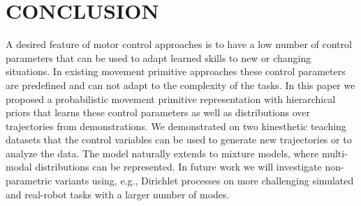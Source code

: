\documentclass[letterpaper, 10 pt, conference]{ieeeconf}  %
\begin{document}
\section{CONCLUSION}
  
A desired feature of motor control approaches is to have a low number of 
control parameters that can be used to adapt learned skills to new or changing situations. 
In existing movement primitive approaches \cite{Paraschos2013,Ijspeert2003,Khansari-Zadeh2011} 
 these control parameters are predefined and can not adapt to the complexity of the tasks. 
In this paper we proposed a probabilistic movement primitive representation with hierarchical priors 
that learns these control parameters as well as distributions over trajectories 
from demonstrations. We demonstrated on two kinesthetic teaching datasets that 
the control variables can be used to generate new trajectories or to analyze the data. 
The model naturally extends to mixture models, where multi-modal distributions can be represented. 
In future work we will investigate non-parametric variants using, e.g., Dirichlet processes 
on more challenging simulated and real-robot tasks with a larger number of modes.

\end{document}
